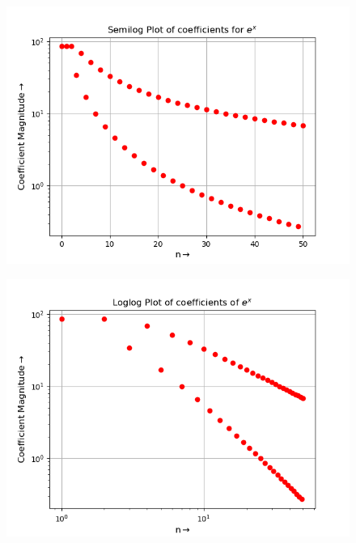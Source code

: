 \documentclass[11pt, a4paper]{article}
\begin{document}
\begin{figure}
\centering
\begin{minipage}{.5\textwidth}
  \centering
  \includegraphics[width=0.9\linewidth]{fig3.png}
  \label{fig:test1}
\end{minipage}%
\begin{minipage}{.5\textwidth}
  \centering
  \includegraphics[width=\linewidth]{fig4.png}
  \label{fig:test2}
\end{minipage}
\end{figure}
\end{document}
